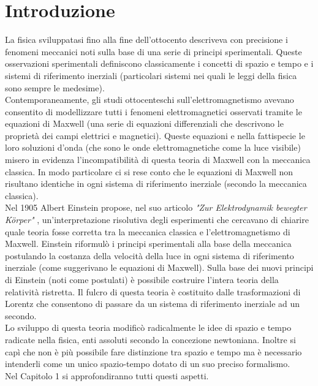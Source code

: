 \chapter*{Introduzione}   

La fisica sviluppatasi fino alla fine dell'ottocento descriveva con precisione i fenomeni meccanici noti sulla base di una serie di principi sperimentali. Queste osservazioni sperimentali definiscono classicamente i concetti di spazio e tempo e i sistemi di riferimento inerziali (particolari sistemi nei quali le leggi della fisica sono sempre le medesime).\\
Contemporaneamente, gli studi ottocenteschi sull'elettromagnetismo avevano consentito di modellizzare tutti i fenomeni elettromagnetici osservati tramite le equazioni di Maxwell (una serie di equazioni differenziali che descrivono le proprietà dei campi elettrici e magnetici). Queste equazioni e nella fattispecie le loro soluzioni d'onda (che sono le onde elettromagnetiche come la luce visibile) misero in evidenza l'incompatibilità di questa teoria di Maxwell con la meccanica classica. In modo particolare ci si rese conto che le equazioni di Maxwell non risultano identiche in ogni sistema di riferimento inerziale (secondo la meccanica classica).\\
Nel 1905 Albert Einstein propose, nel suo articolo \emph{"Zur Elektrodynamik bewegter Körper"} \cite{Einstein1905}, un'interpretazione risolutiva degli esperimenti che cercavano di chiarire quale teoria fosse corretta tra la meccanica classica e l'elettromagnetismo di Maxwell. Einstein riformulò i principi sperimentali alla base della meccanica postulando la costanza della velocità della luce in ogni sistema di riferimento inerziale (come suggerivano le equazioni di Maxwell). Sulla base dei nuovi principi di Einstein (noti come postulati) è possibile costruire l'intera teoria della relatività ristretta. Il fulcro di questa teoria è costituito dalle trasformazioni di Lorentz che consentono di passare da un sistema di riferimento inerziale ad un secondo.\\
Lo sviluppo di questa teoria modificò radicalmente le idee di spazio e tempo radicate nella fisica, enti assoluti secondo la concezione newtoniana. Inoltre si capì che non è più possibile fare distinzione tra spazio e tempo ma è necessario intenderli come un unico spazio-tempo dotato di un suo preciso formalismo.\\
Nel Capitolo 1 si approfondiranno tutti questi aspetti.\\

